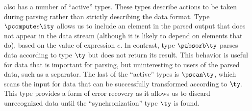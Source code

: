 \ddc{} also has a number of ``active'' types.  These types describe
actions to be taken during parsing rather than strictly describing the
data format. Type $\pcompute e \ity$ allows us to include an element
in the parsed output that does not appear in the data stream (although
it is likely to depend on elements that do), based on the value of
expression $e$.  In contrast, type $\pabsorb \ty$ parses data
according to type $\ty$ but does not return its result. This behavior
is useful for data that is important for parsing, but uninteresting to
users of the parsed data, such as a separator. The last of the
``active'' types is $\pscan \ty$, which scans the input for data that
can be successfully transformed according to $\ty$. This type provides
a form of error recovery as it allows us to discard unrecognized data
until the ``synchronization'' type $\ty$ is found.

